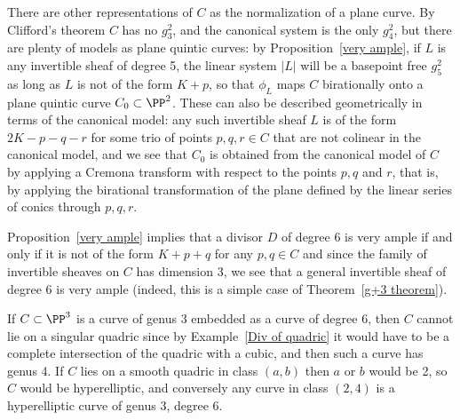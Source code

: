 There are other representations of $C$ as the normalization of a plane curve. By Clifford's theorem $C$ has no $g^2_3$, and the canonical system is the only $g^2_4$, but there are plenty of models as plane quintic curves: by Proposition~\ref{very ample}, if $L$ is any invertible sheaf of degree 5, the linear system $|L|$ will be a basepoint free $g^2_5$ as long as $L$ is not of the form $K+p$, so that $\phi_L$ maps $C$ birationally onto a plane quintic curve $C_0 \subset \PP^2$. These can also be described geometrically in terms of the canonical model: any such invertible sheaf $L$ is of the form $2K-p-q-r$ for some trio of  points $p, q, r \in C$ that are not colinear in the canonical model, and we see  that $C_0$ is obtained from the canonical model of $C$ by applying a Cremona transform with respect to the points $p, q$ and $r$, that is, by applying the birational transformation
of the plane defined by the linear series of conics through $p,q,r$.

Proposition~\ref{very ample} implies that a divisor $D$ of degree 6 is very ample if and only if it is not of the form $K+p+q$ for any $p, q \in C$ and since the family of invertible sheaves on $C$ has dimension 3,  we see that a general invertible sheaf of degree 6 is very ample (indeed, this is a simple case of Theorem~\ref{g+3 theorem}).  

If $C\subset \PP^3$ is a curve of genus 3 embedded as a curve of degree 6, then $C$ cannot lie on a singular quadric since by Example~\ref{Div of quadric} it would
have to be a complete intersection of the quadric with a cubic, and then such a curve has genus 4. If $C$ lies on a smooth quadric
in class $(a,b)$ then $a$ or $b$ would be 2, so $C$ would be hyperelliptic, and conversely any curve in class $(2,4)$ 
is a hyperelliptic curve of genus 3, degree 6. 


